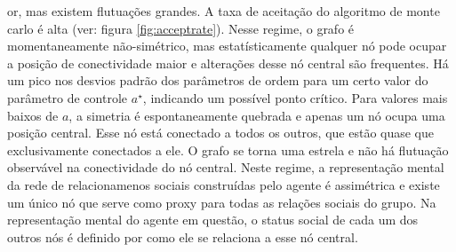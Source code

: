 \begin{figure}
\end{figure}or, mas existem flutuações grandes. A taxa de aceitação do algoritmo de monte carlo é alta (ver: figura \ref{fig:acceptrate}). Nesse regime, o grafo é momentaneamente não-simétrico, mas estatísticamente qualquer nó pode ocupar a posição de conectividade maior e alterações desse nó central são frequentes. Há um pico nos desvios padrão dos parâmetros de ordem para um certo valor do parâmetro de controle $a^{\star}$, indicando um possível ponto crítico. Para valores mais baixos de $a$, a simetria é espontaneamente quebrada e apenas um nó ocupa uma posição central. Esse nó está conectado a todos os outros, que estão quase que exclusivamente conectados a ele. O grafo se torna uma estrela e não há flutuação observável na conectividade do nó central. Neste regime, a representação mental da rede de relacionamenos sociais construídas pelo agente é assimétrica e existe um único nó que serve como proxy para todas as relações sociais do grupo. Na representação mental do agente em questão, o status social de cada um dos outros nós é definido por como ele se relaciona a esse nó central.

